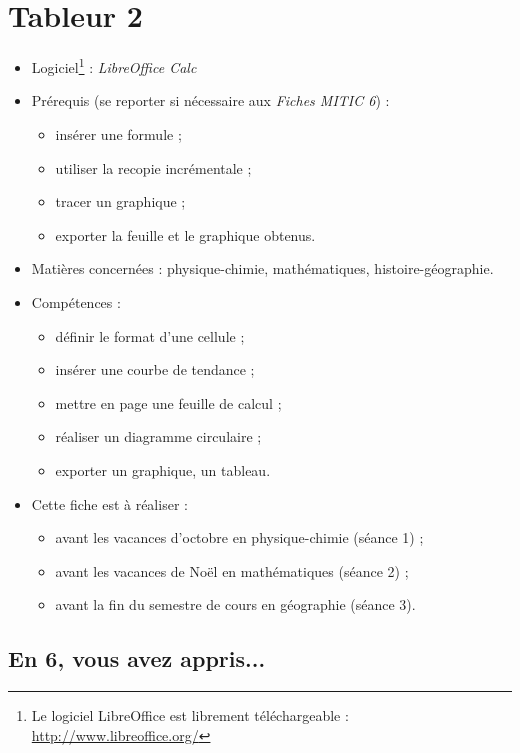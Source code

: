 \chapter{Tableur 2}  

{\footnotesize
\begin{itemize}
\item Logiciel\footnote{Le logiciel LibreOffice est librement téléchargeable : \url{http://www.libreoffice.org/}} : \emph{LibreOffice Calc}
\item Prérequis (se reporter si nécessaire aux \emph{Fiches MITIC 6}) :
        \begin{itemize}
        \item insérer une formule ;
        \item utiliser la recopie incrémentale ;
        \item tracer un graphique ;
        \item exporter la feuille et le graphique obtenus.
        \end{itemize}
\item Matières concernées : physique-chimie, mathématiques, histoire-géographie.
\item Compétences : 
        \begin{itemize}
        \item définir le format d'une cellule ;
        \item insérer une courbe de tendance ;
        \item mettre en page une feuille de calcul ;
        \item réaliser un diagramme circulaire ;
        \item exporter un graphique, un tableau.
        \end{itemize}
\item Cette fiche est à réaliser :
        \begin{itemize}
        \item avant les vacances d'octobre en physique-chimie (séance 1) ;
        \item avant les vacances de Noël en mathématiques (séance 2) ;
        \item avant la fin du semestre de cours en géographie (séance 3). 
        \end{itemize}
\end{itemize}
}%


\section*{En 6, vous avez appris...}


